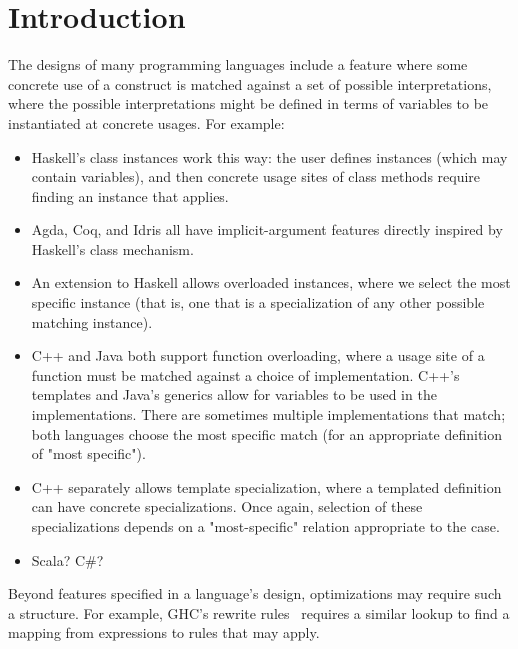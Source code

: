 \documentclass[acmsmall]{acmart}
\theoremstyle{theorem}
\theoremstyle{definition}
\theoremstyle{remark}
\begin{document}
\maketitle


\section{Introduction} \label{sec:intro}

The designs of many programming languages include a feature where some concrete use of a construct is matched against a set of possible interpretations, where the possible interpretations might be defined in terms of variables to be instantiated at concrete usages. For example:
\begin{itemize}
\item Haskell's class instances work this way: the user defines instances (which may contain variables), and then concrete usage sites of class methods require finding an instance that applies.
\item Agda, Coq, and Idris all have implicit-argument features directly inspired by Haskell's class mechanism.
\item An extension to Haskell allows overloaded instances, where we select the most specific instance (that is, one that is a specialization of any other possible matching instance).
\item C++ and Java both support function overloading, where a usage site of a function must be matched against a choice of implementation. C++'s templates and Java's generics allow for variables to be used in the implementations. There are sometimes multiple implementations that match; both languages choose the most specific match (for an appropriate definition of "most specific").
\item C++ separately allows template specialization, where a templated definition can have concrete specializations. Once again, selection of these specializations depends on a "most-specific" relation appropriate to the case.
\item Scala? C\#?
\end{itemize}
Beyond features specified in a language's design, optimizations may require such a structure. For example, GHC's rewrite rules~\cite{rewrite-rules} requires a similar lookup to find a mapping from expressions to rules that may apply.
\end{document}
